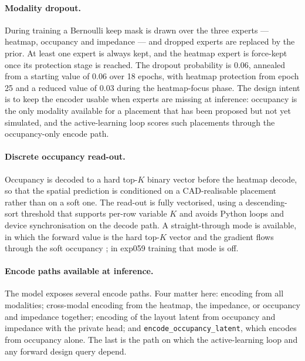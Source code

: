 \paragraph{Modality dropout.} During training a Bernoulli keep mask is drawn over the three experts
--- heatmap, occupancy and impedance --- and dropped experts are replaced by the prior. At least one
expert is always kept, and the heatmap expert is force-kept once its protection stage is reached. The
dropout probability is 0.06, annealed from a starting value of 0.06 over 18 epochs, with heatmap
protection from epoch 25 and a reduced value of 0.03 during the heatmap-focus phase. The design
intent is to keep the encoder usable when experts are missing at inference: occupancy is the only
modality available for a placement that has been proposed but not yet simulated, and the
active-learning loop scores such placements through the occupancy-only encode path.

\paragraph{Discrete occupancy read-out.} Occupancy is decoded to a hard top-$K$ binary vector before
the heatmap decode, so that the spatial prediction is conditioned on a CAD-realisable placement
rather than on a soft one. The read-out is fully vectorised, using a descending-sort threshold that
supports per-row variable $K$ and avoids Python loops and device synchronisation on the decode path.
A straight-through mode is available, in which the forward value is the hard top-$K$ vector and the
gradient flows through the soft occupancy \cite{bengio2013straight}; in exp059 training that mode is
off.

\paragraph{Encode paths available at inference.} The model exposes several encode paths. Four matter
here: encoding from all modalities; cross-modal encoding from the heatmap, the impedance, or
occupancy and impedance together; encoding of the layout latent from occupancy and impedance with the
private head; and \texttt{encode\_occupancy\_latent}, which encodes from occupancy alone. The last is
the path on which the active-learning loop and any forward design query depend.

